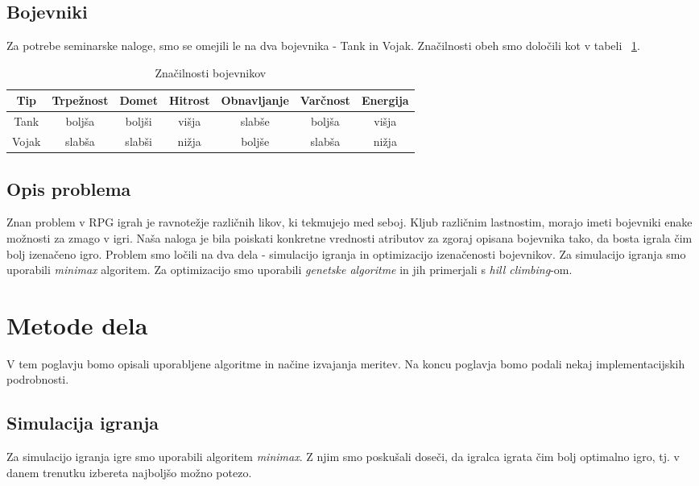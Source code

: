 \documentclass[12pt,a4paper,openany]{book}
\begin{document}
\section{Bojevniki}
Za potrebe seminarske naloge, smo se omejili le na dva bojevnika - Tank in Vojak. 
Značilnosti obeh smo določili kot v tabeli ~\ref{table:bojevniki}. 
\begin{table}[ht] \caption{Značilnosti bojevnikov}
\centering
\begin{tabular}{ccccccc}
\hline\hline
Tip & Trpežnost & Domet & Hitrost & Obnavljanje & Varčnost  & Energija \\ [0.5ex]
\hline 
Tank & boljša & boljši & višja & slabše & boljša & višja\\
Vojak & slabša & slabši & nižja & boljše & slabša & nižja\\ [1ex]
\hline %
\end{tabular}
\label{table:bojevniki} %
\end{table}


\section{Opis problema}
Znan problem v RPG igrah je ravnotežje različnih likov, ki tekmujejo med seboj. Kljub različnim lastnostim, morajo imeti bojevniki enake možnosti za zmago v igri. Naša naloga je bila poiskati konkretne vrednosti atributov za zgoraj opisana bojevnika tako, da bosta igrala čim bolj izenačeno igro. Problem smo ločili na dva dela - simulacijo igranja in optimizacijo izenačenosti bojevnikov. Za simulacijo igranja smo uporabili \textit{minimax} algoritem. Za optimizacijo smo uporabili \textit{genetske algoritme} in jih primerjali s \textit{hill climbing}-om.

\chapter{Metode dela}
V tem poglavju bomo opisali uporabljene algoritme in načine izvajanja meritev. Na koncu poglavja bomo podali nekaj implementacijskih podrobnosti.

\section{Simulacija igranja}
Za simulacijo igranja igre smo uporabili algoritem \textit{minimax}. Z njim smo poskušali doseči, da igralca igrata čim bolj optimalno igro, tj. v danem trenutku izbereta najboljšo možno potezo.
\end{document}
